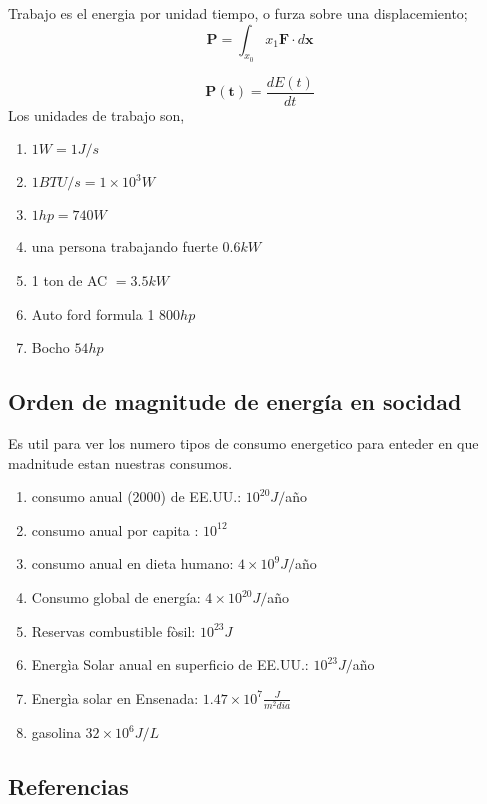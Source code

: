 \documentclass[11pt]{article}
\begin{document}
Trabajo es el energia por unidad tiempo, o furza sobre una displacemiento;
\begin{equation}
	\boldsymbol{P}=\int_{x_0}{x_1} \boldsymbol{F} \cdot d\boldsymbol{x}
\end{equation}

\begin{equation}
	\boldsymbol{P(t)}=\frac {d E(t)} {d t}
\end{equation}
 Los unidades de trabajo son, 
 
 \begin{enumerate}
 	\item $1W=1J/s$
 	\item $1BTU/s=1 \times 10^3 W$
 	\item $1 hp=740W$
 	\item una persona trabajando fuerte $0.6 kW$
 	\item 1 ton de AC $=3.5 kW$
 	\item Auto ford formula 1 $800 hp$
 	\item Bocho $54 hp$
 \end{enumerate}


\subsection{Orden de magnitude de energ\'ia en socidad}

Es util para ver los numero tipos de consumo energetico para enteder en que madnitude estan nuestras consumos.

\begin{enumerate}
	\item consumo anual (2000) de EE.UU.: $10^{20} J/$a\~no 
	\item consumo anual por capita : $10^{12}$
	\item consumo anual en dieta humano: $4 \times 10^9 J/$a\~no
	\item Consumo global de energ\'ia: $4\times 10^{20}J/$a\~no
	\item Reservas combustible f\`osil: $10^{23}J$
	\item Energ\`ia Solar anual en superficio de EE.UU.: $10^{23} J/$a\~no 
	\item Energ\`ia solar en Ensenada: $1.47 \times 10^7 \frac {J} {m^2 dia}$
	\item gasolina $32 \times 10^6 J/L$  
\end{enumerate}

\subsection{Referencias}\

\cite{planeEnglish}


%
%
\end{document}
